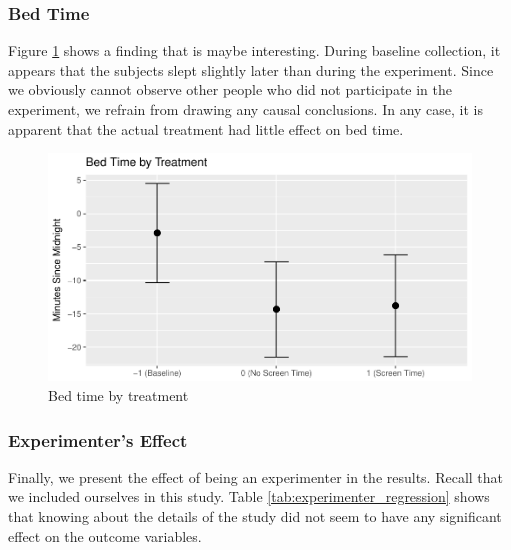 \documentclass[12pt,]{article}
\begin{document}
\hypertarget{bed-time}{%
\subsubsection{Bed Time}\label{bed-time}}

Figure \ref{fig:bed_time_fig} shows a finding that is maybe interesting.
During baseline collection, it appears that the subjects slept slightly
later than during the experiment. Since we obviously cannot observe
other people who did not participate in the experiment, we refrain from
drawing any causal conclusions. In any case, it is apparent that the
actual treatment had little effect on bed time.

\begin{figure}
\centering
\includegraphics{report_files/figure-latex/bed_time_fig-1.pdf}
\caption{\label{fig:bed_time_fig} Bed time by treatment}
\end{figure}

\hypertarget{experimenters-effect}{%
\subsubsection{Experimenter's Effect}\label{experimenters-effect}}

Finally, we present the effect of being an experimenter in the results.
Recall that we included ourselves in this study. Table
\ref{tab:experimenter_regression} shows that knowing about the details
of the study did not seem to have any significant effect on the outcome
variables.
\end{document}
